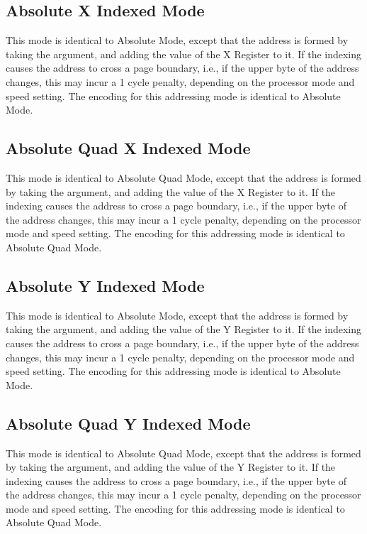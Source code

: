 \subsection{Absolute X Indexed Mode}

This mode is identical to Absolute Mode, except that the address is formed by taking the
argument, and adding the value of the X Register to it.  If the indexing causes the address
to cross a page boundary, i.e., if the upper byte of the address changes, this may incur a
1 cycle penalty, depending on the processor mode and speed setting.
The encoding for this addressing mode is identical to Absolute Mode.

\subsection{Absolute Quad X Indexed Mode}

This mode is identical to Absolute Quad Mode, except that the address is formed by taking the
argument, and adding the value of the X Register to it.  If the indexing causes the address
to cross a page boundary, i.e., if the upper byte of the address changes, this may incur a
1 cycle penalty, depending on the processor mode and speed setting.
The encoding for this addressing mode is identical to Absolute Quad Mode.

\subsection{Absolute Y Indexed Mode}

This mode is identical to Absolute Mode, except that the address is formed by taking the
argument, and adding the value of the Y Register to it.  If the indexing causes the address
to cross a page boundary, i.e., if the upper byte of the address changes, this may incur a
1 cycle penalty, depending on the processor mode and speed setting.
The encoding for this addressing mode is identical to Absolute Mode.

\subsection{Absolute Quad Y Indexed Mode}

This mode is identical to Absolute Quad Mode, except that the address is formed by taking the
argument, and adding the value of the Y Register to it.  If the indexing causes the address
to cross a page boundary, i.e., if the upper byte of the address changes, this may incur a
1 cycle penalty, depending on the processor mode and speed setting.
The encoding for this addressing mode is identical to Absolute Quad Mode.

